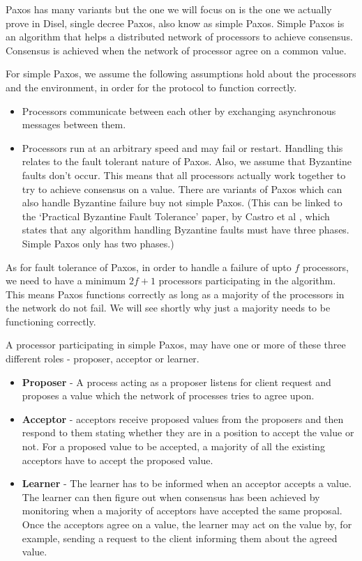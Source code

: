 Paxos has many variants but the one we will focus on is the one we actually prove
in Disel, single decree Paxos, also know as simple Paxos. Simple Paxos is an algorithm
that helps a distributed network of processors to achieve consensus.
Consensus is achieved when the network of processor agree on a common value.

For simple Paxos, we assume the following assumptions hold about the processors
and the environment, in order for the protocol to function correctly.
\begin{itemize}
  \item Processors communicate between each other by exchanging asynchronous messages between them.
  \item Processors run at an arbitrary speed and may fail or restart. Handling this relates
    to the fault tolerant nature of Paxos. Also, we assume that Byzantine faults don't occur.
    This means that all processors actually work together to try to achieve consensus on a value.
    There are variants of Paxos which can also handle Byzantine failure buy not simple Paxos.
    (This can be linked to the `Practical Byzantine Fault Tolerance' paper, by Castro et al \cite{2},
    which states that any algorithm handling
    Byzantine faults must have three phases. Simple Paxos only has two phases.)
\end{itemize}

As for fault tolerance of Paxos, in order to handle a failure of upto $f$ processors,
we need to have a minimum $2f + 1$ processors participating in the algorithm. This
means Paxos functions correctly as long as a majority of the processors in the
network do not fail. We will see shortly why just a majority needs to be functioning
correctly.

A processor participating in simple Paxos, may have one or more of these three
different roles - proposer, acceptor or learner.
\begin{itemize}
  \item \textbf{Proposer} - A process acting as a proposer listens for client
    request and proposes a value which the network of processes tries to agree upon.
  \item \textbf{Acceptor} - acceptors receive proposed values from the proposers
    and then respond to them stating whether they are in a position to accept the value or not.
    For a proposed value to be accepted, a majority of all the existing acceptors
    have to accept the proposed value.
  \item \textbf{Learner} - The learner has to be informed when an acceptor accepts a value.
    The learner can then figure out when consensus has been achieved by monitoring
    when a majority of acceptors have accepted the same proposal.
    Once the acceptors agree on a value, the learner may act on the value by,
    for example, sending a request to the client informing them about the agreed value.
\end{itemize}

